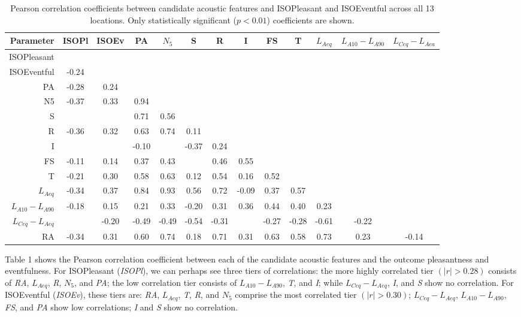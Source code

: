 \begin{table}[ht]
\caption{Pearson correlation coefficients between candidate acoustic features and ISOPleasant and ISOEventful across all 13 locations. Only statistically significant ($p < 0.01$) coefficients are shown.}
\label{tab:corr}
\centering
\def\arraystretch{.5}
\begin{ruledtabular}
\begin{tabular}{@{}r|cccccccccccc@{}}
\textbf{Parameter} & \textbf{ISOPl} & \textbf{ISOEv} & \textbf{PA} & $N_5$ & \textbf{S} & \textbf{R} & \textbf{I} & \textbf{FS} & \textbf{T} & $L_{Aeq}$ & $L_{A10}-L_{A90}$ & $L_{Ceq}-L_{Aea}$ \\ 
 \midrule
 ISOPleasant &  &  &  &  &  &  &  &  &  &  &  &  \\ 
  ISOEventful & -0.24 &  &  &  &  &  &  &  &  &  &  &  \\ 
  PA & -0.28 &  0.24 &  &  &  &  &  &  &  &  &  &  \\ 
  N5 & -0.37 &  0.33 &  0.94 &  &  &  &  &  &  &  &  &  \\ 
  S &      &      &  0.71 &  0.56 &  &  &  &  &  &  &  &  \\ 
  R & -0.36 &  0.32 &  0.63 &  0.74 &  0.11  &  &  &  &  &  &  &  \\ 
  I &     &       & -0.10  &      & -0.37 &  0.24 &  &  &  &  &  &  \\ 
  FS & -0.11  &  0.14 &  0.37 &  0.43 &      &  0.46 &  0.55 &  &  &  &  &  \\ 
  T & -0.21 &  0.30 &  0.58 &  0.63 &  0.12 &  0.54 &  0.16 &  0.52 &  &  &  &  \\ 
  $L_{Aeq}$ & -0.34 &  0.37 &  0.84 &  0.93 &  0.56 &  0.72 & -0.09   &  0.37 &  0.57 &  &  &  \\ 
  $L_{A10}-L_{A90}$ & -0.18 &  0.15 &  0.21 &  0.33 & -0.20 &  0.31 &  0.36 &  0.44 &  0.40 &  0.23 &  &  \\ 
  $L_{Ceq}-L_{Aeq}$ &      & -0.20 & -0.49 & -0.49 & -0.54 & -0.31 &      & -0.27 & -0.28 & -0.61 & -0.22 &  \\ 
  RA & -0.34 &  0.31 &  0.60 &  0.74 &  0.18 &  0.71 &  0.31 &  0.63 &  0.58 &  0.73 &  0.23 & -0.14 \\ 
\end{tabular}
\end{ruledtabular}
\end{table}

Table 1 shows the Pearson correlation coefficient between each of the candidate acoustic features and the outcome pleasantness and eventfulness. For ISOPleasant (\textit{ISOPl}), we can perhaps see three tiers of correlations: the more highly correlated tier $(|r| > 0.28)$ consists of \textit{RA}, $L_{Aeq}$, \textit{R}, $N_5$, and \textit{PA}; the low correlation tier consists of $L_{A10}-L_{A90}$, \textit{T}, and \textit{I}; while $L_{Ceq}-L_{Aeq}$, \textit{I}, and \textit{S} show no correlation. For ISOEventful (\textit{ISOEv}), these tiers are: \textit{RA}, $L_{Aeq}$, \textit{T}, \textit{R}, and $N_5$ comprise the most correlated tier $(|r| > 0.30)$; $L_{Ceq}-L_{Aeq}$, $L_{A10}-L_{A90}$, \textit{FS}, and \textit{PA} show low correlations; \textit{I} and \textit{S} show no correlation.

